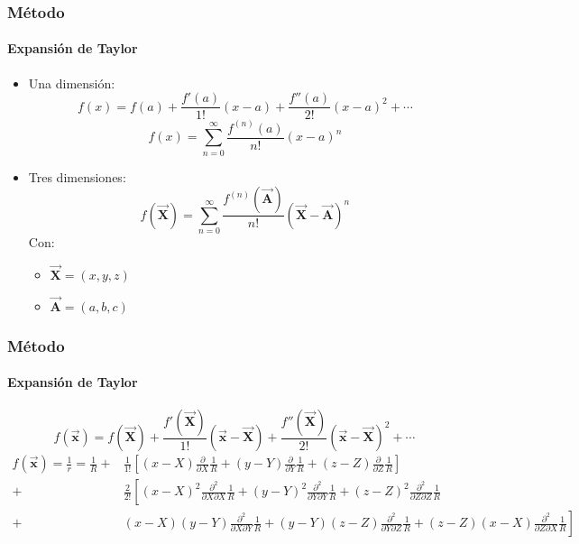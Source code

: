 \begin{frame}
    \frametitle{Método}
    \framesubtitle{Expansión de Taylor}

    \begin{itemize}
        \item Una dimensión:
            $$f(x) = f(a) + \frac{f'(a)}{1!} (x-a)+\frac{f''(a)}{2!} (x-a)^{2} + \cdots$$
            $$f(x) = \sum_{n=0}^{\infty} \frac{f^{(n)}(a)}{n!} (x-a)^{n}$$
        \item Tres dimensiones:
            $$f(\vec{\mathbf{X}}) = \sum_{n=0}^{\infty} \frac{f^{(n)}(\vec{\mathbf{A}})}{n!} (\vec{\mathbf{X}} - \vec{\mathbf{A}})^{n}$$
            Con:
            \begin{itemize}
                \item $\vec{\mathbf{X}} = (x,y,z)$
                \item $\vec{\mathbf{A}} = (a,b,c)$
            \end{itemize}
    \end{itemize}

    
\end{frame}

\begin{frame}
    \frametitle{Método}
    \framesubtitle{Expansión de Taylor}
    \tiny

    $$f(\vec{\mathbf{x}}) = f(\vec{\mathbf{X}}) + \frac{f'(\vec{\mathbf{X}})}{1!} (\vec{\mathbf{x}}-\vec{\mathbf{X}})+\frac{f''(\vec{\mathbf{X}})}{2!} (\vec{\mathbf{x}}-\vec{\mathbf{X}})^{2} + \cdots$$
    \begin{equation}
    \begin{split}
    f(\vec{\mathbf{x}}) = \frac{1}{r} = \frac{1}{R} +& \frac{1}{1!} \left[ (x-X)\frac{\partial}{\partial X} \frac{1}{R} + (y-Y)\frac{\partial}{\partial Y} \frac{1}{R} +(z-Z)\frac{\partial}{\partial Z} \frac{1}{R} \right] \\
                                     +& \frac{2}{2!} \left[ (x-X)^{2}\frac{\partial^{2}}{\partial X \partial X} \frac{1}{R} + (y-Y)^{2}\frac{\partial^{2}}{\partial Y\partial Y} \frac{1}{R} +(z-Z)^{2}\frac{\partial^{2}}{\partial Z\partial Z} \frac{1}{R} \right. \nonumber \\
                                     +& \left.(x-X)(y-Y) \frac{\partial^{2}}{\partial X \partial Y} \frac{1}{R} + (y-Y)(z-Z)\frac{\partial^{2}}{\partial Y\partial Z} \frac{1}{R} + (z-Z)(x-X)\frac{\partial^{2}}{\partial Z \partial X} \frac{1}{R} \right]
    \end{split}
    \end{equation}
\end{frame}

